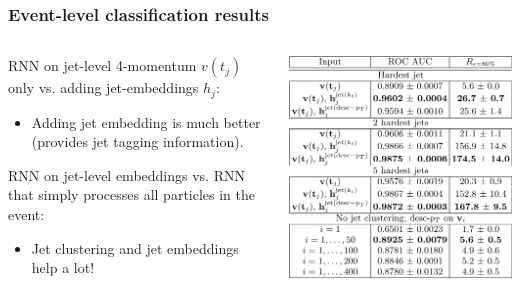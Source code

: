\documentclass{beamer}
\begin{document}
\begin{frame}
    \frametitle{Event-level classification results}

    \begin{columns}
        \begin{column}{0.6\textwidth}
            RNN on jet-level 4-momentum $v(t_j)$ only vs. adding jet-embeddings $h_j$:
            \begin{itemize}
                \item Adding jet embedding is much better (provides jet tagging information).
            \end{itemize}

            \vspace{0.5cm}

             RNN on jet-level embeddings vs. RNN that simply processes all particles in the event:
            \begin{itemize}
                \item Jet clustering and jet embeddings help a lot!
            \end{itemize}
        \end{column}
        \begin{column}{0.4\textwidth}
            \centering
            \includegraphics[width=\textwidth]{figures/table2.png}
        \end{column}
    \end{columns}
\end{frame}
\end{document}
